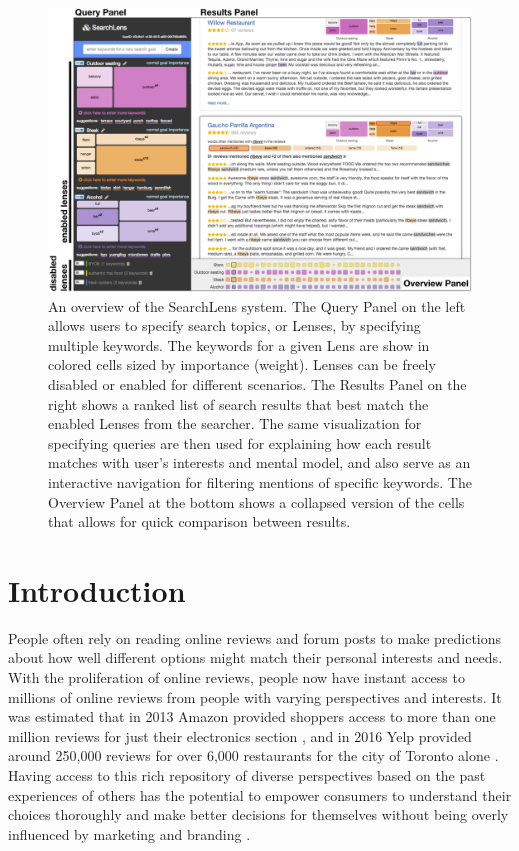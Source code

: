 
\begin{figure}
    \centering
    \includegraphics[width=1.0\textwidth]{Chapters/SearchLens/figures/main_annotated.png}
    \caption[An overview of the SearchLens system.]{An overview of the SearchLens system. The Query Panel on the left allows users to specify search topics, or Lenses, by specifying multiple keywords. The keywords for a given Lens are show in colored cells sized by importance (weight). Lenses can be freely disabled or enabled for different scenarios. The Results Panel on the right shows a ranked list of search results that best match the enabled Lenses from the searcher. The same visualization for specifying queries are then used for explaining how each result matches with user's interests and mental model, and also serve as an interactive navigation for filtering mentions of specific keywords. The Overview Panel at the bottom shows a collapsed version of the cells that allows for quick comparison between results.}
    \label{fig:sl_flow}
\end{figure}

\section{Introduction}

People often rely on reading online reviews and forum posts to make predictions about how well different options might match their personal interests and needs.  With the proliferation of online reviews, people now have instant access to millions of online reviews from people with varying perspectives and interests. It was estimated that in 2013 Amazon provided shoppers access to more than one million reviews for just their electronics section \cite{mcauley2013hidden}, and in 2016 Yelp provided around 250,000 reviews for over 6,000 restaurants for the city of Toronto alone \cite{yelpdata}. Having access to this rich repository of diverse perspectives based on the past experiences of others has the potential to empower consumers to understand their choices thoroughly and make better decisions for themselves without being overly influenced by marketing and branding \cite{de2015navigating}.

